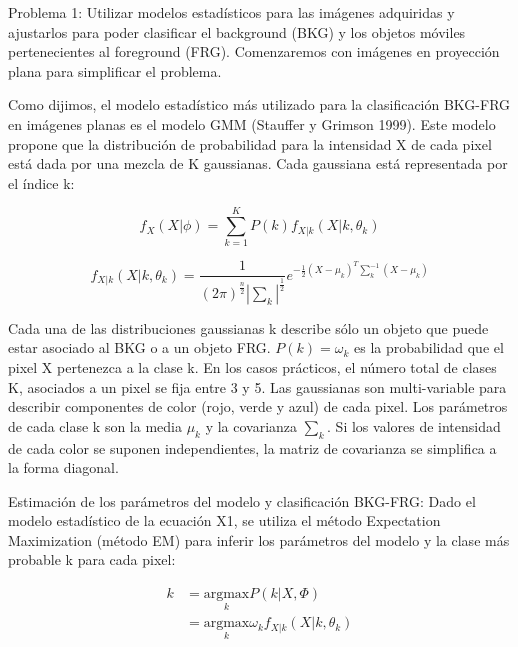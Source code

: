 \documentclass[12pt,a4paper]{article}
\begin{document}
Problema 1: Utilizar modelos estadísticos para las imágenes adquiridas y ajustarlos para poder clasificar el background (BKG) y los objetos móviles pertenecientes al foreground (FRG). Comenzaremos con imágenes en proyección plana para simplificar el problema.

Como dijimos, el modelo estadístico más utilizado para la clasificación BKG-FRG en imágenes planas es el modelo GMM (Stauffer y Grimson 1999). Este modelo propone que la distribución de probabilidad para la intensidad X de cada pixel está dada por una mezcla de K gaussianas. Cada gaussiana está representada por el índice k:

\begin{equation}
    f_{X}\left(X|\phi\right) =
    \sum\limits_{k=1}^K P\left(k\right)f_{X|k}\left(X|k,\theta_{k}\right)
\end{equation}

\begin{equation}
    f_{X|k}\left(X|k,\theta_{k}\right) =
    \frac{1}{\left(2\pi\right)^{\frac{n}{2}}|\sum_k|^{\frac{1}{2}}}
    e^{-\frac{1}{2}\left(X-\mu_k\right)^T\sum_k^{-1}\left(X-\mu_k\right)}
\end{equation}

Cada una de las distribuciones gaussianas k describe sólo un objeto que puede estar asociado al BKG o a un objeto FRG. $P(k)=\omega_k$ es la probabilidad que el pixel X pertenezca a la clase k. En los casos prácticos, el número total de clases K, asociados a un pixel se fija entre 3 y 5. Las gaussianas son multi-variable para describir componentes de color (rojo, verde y azul) de cada pixel. Los parámetros de cada clase k son la media $\mu_k$ y la covarianza $\sum_k$. Si los valores de intensidad de cada color se suponen independientes, la matriz de covarianza se simplifica a la forma diagonal. 

Estimación de los parámetros del modelo y clasificación BKG-FRG:  Dado el modelo estadístico de la ecuación X1, se utiliza el método Expectation Maximization (método EM) para inferir los parámetros del modelo y la clase más probable k para cada pixel: 

\begin{equation}
  \begin{split}
    k & = \underset{k}{\text{argmax}} P\left(k|X,\Phi\right)
  \\
      & = \underset{k}{\text{argmax}} \omega_k f_{X|k}\left(X|k,\theta_k\right)
  \end{split}
\end{equation}
\end{document}
